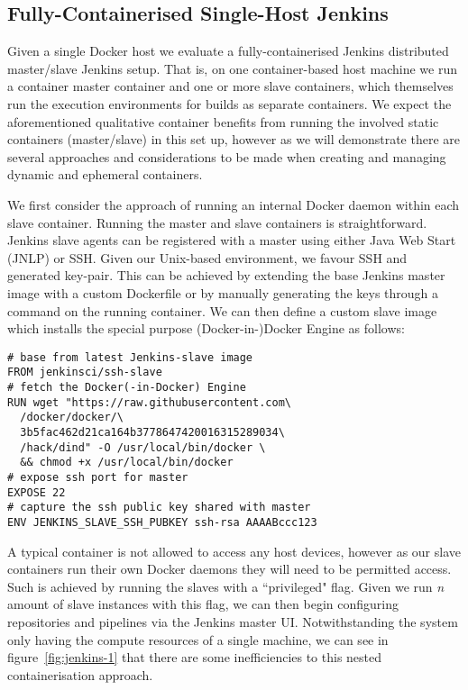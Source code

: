 \documentclass{report}
\begin{document}
\subsection{Fully-Containerised Single-Host Jenkins}
Given a single Docker host we evaluate a fully-containerised Jenkins 
distributed master/slave Jenkins setup. That is, on one container-based
host machine we run a container master container and one or more slave containers,
which themselves run the execution environments for builds as separate containers. 
We expect the aforementioned qualitative container benefits from running the involved static 
containers (master/slave) in this set up, however as we will demonstrate 
there are several approaches and considerations to be made when creating and managing
dynamic and ephemeral containers.
\par
We first consider the approach of running an internal Docker daemon within
each slave container. Running the master and slave containers is straightforward. 
Jenkins slave agents can be registered with a master using either Java Web Start (JNLP) or SSH.
Given our Unix-based environment, we favour SSH and generated key-pair. This can be 
achieved by extending the base Jenkins master image with a custom Dockerfile or 
by manually generating the keys through a command on the running container. 
We can then define a custom slave image which installs the special purpose (Docker-in-)Docker 
Engine as follows:
\begin{verbatim}
# base from latest Jenkins-slave image
FROM jenkinsci/ssh-slave
# fetch the Docker(-in-Docker) Engine
RUN wget "https://raw.githubusercontent.com\
  /docker/docker/\
  3b5fac462d21ca164b3778647420016315289034\
  /hack/dind" -O /usr/local/bin/docker \
  && chmod +x /usr/local/bin/docker
# expose ssh port for master
EXPOSE 22
# capture the ssh public key shared with master
ENV JENKINS_SLAVE_SSH_PUBKEY ssh-rsa AAAABccc123
\end{verbatim}	
A typical container is not allowed to access any host devices,
however as our slave containers run their own Docker daemons they will need to be permitted access. 
Such is achieved by running the slaves with a ``privileged" flag. Given we run \textit{n} amount of slave instances
with this flag, we can then begin configuring repositories and pipelines via the
Jenkins master UI. Notwithstanding the system only having the compute resources of a single machine, 
we can see in figure~\ref{fig:jenkins-1} that there are some inefficiencies to this nested containerisation
approach.
\end{document}

